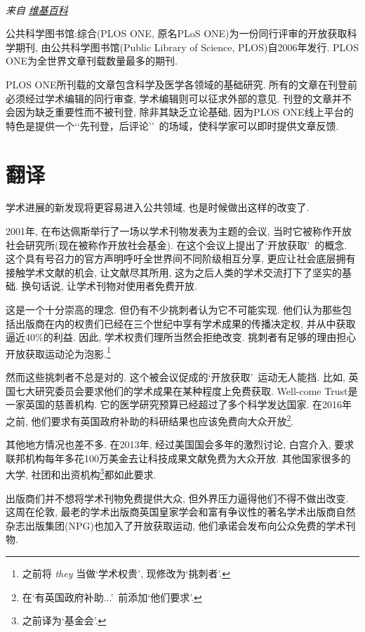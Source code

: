 \documentclass[a4paper, 12pt, UTF8]{article}
\begin{document}
\paragraph*{}
    \emph{\small 来自} \href{https://en.wikipedia.org/wiki/PLOS_One}{\emph{\small 维基百科}}

公共科学图书馆:综合(PLOS ONE, 原名PLoS ONE)为一份同行评审的开放获取科学期刊, 由公共科学图书馆(Public Library of Science, PLOS)自2006年发行. PLOS ONE为全世界文章刊载数量最多的期刊.

PLOS ONE所刊载的文章包含科学及医学各领域的基础研究. 所有的文章在刊登前必须经过学术编辑的同行审查, 学术编辑则可以征求外部的意见. 刊登的文章并不会因为缺乏重要性而不被刊登, 除非其缺乏立论基础, 因为PLOS ONE线上平台的特色是提供一个\lq\lq 先刊登，后评论\rq\rq\ 的场域，使科学家可以即时提供文章反馈.


\newpage
\section{翻译}
学术进展的新发现将更容易进入公共领域, 也是时候做出这样的改变了.

2001年, 在布达佩斯举行了一场以学术刊物发表为主题的会议, 当时它被称作开放社会研究所(现在被称作开放社会基金). 在这个会议上提出了\lq 开放获取\rq\ 的概念. 这个具有号召力的官方声明呼吁全世界间不同阶级相互分享, 更应让社会底层拥有接触学术文献的机会, 让文献尽其所用, 这为之后人类的学术交流打下了坚实的基础. 换句话说, 让学术刊物对使用者免费开放.

这是一个十分崇高的理念. 但仍有不少挑刺者认为它不可能实现. 他们认为那些包括出版商在内的权贵们已经在三个世纪中享有学术成果的传播决定权, 并从中获取逼近40\%的利益. 因此, 学术权贵们理所当然会拒绝改变. 挑刺者有足够的理由担心开放获取运动沦为泡影.\footnote[1]{之前将 \emph{they} 当做\lq 学术权贵\rq, 现修改为\lq 挑刺者\rq.}

然而这些挑刺者不总是对的. 这个被会议促成的\lq 开放获取\rq\ 运动无人能挡. 比如, 英国七大研究委员会要求他们的学术成果在某种程度上免费获取. Well-come Trust是一家英国的慈善机构. 它的医学研究预算已经超过了多个科学发达国家. 在2016年之前, 他们要求有英国政府补助的科研结果也应该免费向大众开放\footnote[2]{在\lq 有英国政府补助...\rq\ 前添加\lq 他们要求\rq.}.

其他地方情况也差不多. 在2013年, 经过美国国会多年的激烈讨论, 白宫介入, 要求联邦机构每年多花100万美金去让科技成果文献免费为大众开放. 其他国家很多的大学, 社团和出资机构\footnote[3]{之前译为\lq 基金会\rq.}都如此要求.

出版商们并不想将学术刊物免费提供大众, 但外界压力逼得他们不得不做出改变. 这周在伦敦, 最老的学术出版商英国皇家学会和富有争议性的著名学术出版商自然杂志出版集团(NPG)也加入了开放获取运动, 他们承诺会发布向公众免费的学术刊物.
\end{document}

